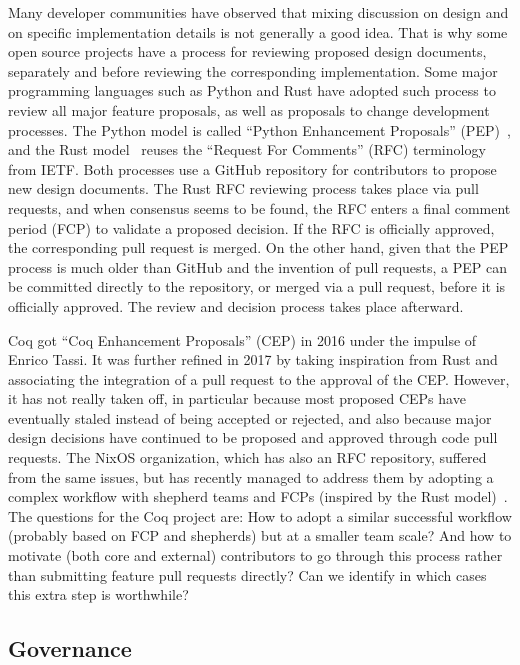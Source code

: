 Many developer communities have observed that mixing discussion on design and on specific implementation details is not generally a good idea.
That is why some open source projects have a process for reviewing proposed design documents, separately and before reviewing the corresponding implementation.
Some major programming languages such as Python and Rust have adopted such process to review all major feature proposals, as well as proposals to change development processes.
The Python model is called ``Python Enhancement Proposals'' (PEP)~\cite{pep1,van2007python}, and the Rust model~\cite{rust_rfc_book} reuses the ``Request For Comments'' (RFC) terminology from IETF.
Both processes use a GitHub repository for contributors to propose new design documents.
The Rust RFC reviewing process takes place via pull requests, and when consensus seems to be found, the RFC enters a final comment period (FCP) to validate a proposed decision.
If the RFC is officially approved, the corresponding pull request is merged.
On the other hand, given that the PEP process is much older than GitHub and the invention of pull requests, a PEP can be committed directly to the repository, or merged via a pull request, before it is officially approved.
The review and decision process takes place afterward.

Coq got ``Coq Enhancement Proposals'' (CEP) in 2016 under the impulse of Enrico Tassi.
It was further refined in 2017 by taking inspiration from Rust and associating the integration of a pull request to the approval of the CEP.
However, it has not really taken off, in particular because most proposed CEPs have eventually staled instead of being accepted or rejected, and also because major design decisions have continued to be proposed and approved through code pull requests.
The NixOS organization, which has also an RFC repository, suffered from the same issues, but has recently managed to address them by adopting a complex workflow with shepherd teams and FCPs (inspired by the Rust model)~\cite{gloster2018rfc}.
The questions for the Coq project are:
How to adopt a similar successful workflow (probably based on FCP and shepherds) but at a smaller team scale?
And how to motivate (both core and external) contributors to go through this process rather than submitting feature pull requests directly?
Can we identify in which cases this extra step is worthwhile?

\subsection{Governance}

